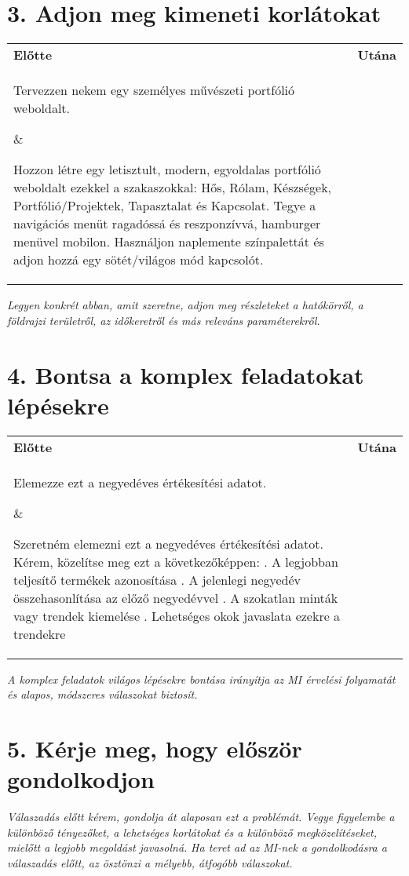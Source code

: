 \documentclass[a4paper, 11pt]{article}
\begin{document}
\section*{3. Adjon meg kimeneti korlátokat}
\begin{tabular}{p{} p{}}
\textbf{Előtte} & \textbf{Utána} \\
\parbox[t]{0.45\textwidth}{Tervezzen nekem egy személyes művészeti portfólió weboldalt.} & \parbox[t]{0.45\textwidth}{Hozzon létre egy letisztult, modern, egyoldalas portfólió weboldalt ezekkel a szakaszokkal: Hős, Rólam, Készségek, Portfólió/Projektek, Tapasztalat és Kapcsolat. Tegye a navigációs menüt ragadóssá és reszponzívvá, hamburger menüvel mobilon. Használjon naplemente színpalettát és adjon hozzá egy sötét/világos mód kapcsolót.} \\
\end{tabular}
\textit{Legyen konkrét abban, amit szeretne, adjon meg részleteket a hatókörről, a földrajzi területről, az időkeretről és más releváns paraméterekről.}

\section*{4. Bontsa a komplex feladatokat lépésekre}
\begin{tabular}{p{} p{}}
\textbf{Előtte} & \textbf{Utána} \\
\parbox[t]{0.45\textwidth}{Elemezze ezt a negyedéves értékesítési adatot.} & \parbox[t]{0.45\textwidth}{Szeretném elemezni ezt a negyedéves értékesítési adatot. Kérem, közelítse meg ezt a következőképpen: . A legjobban teljesítő termékek azonosítása . A jelenlegi negyedév összehasonlítása az előző negyedévvel . A szokatlan minták vagy trendek kiemelése . Lehetséges okok javaslata ezekre a trendekre} \\
\end{tabular}
\textit{A komplex feladatok világos lépésekre bontása irányítja az MI érvelési folyamatát és alapos, módszeres válaszokat biztosít.}

\section*{5. Kérje meg, hogy először gondolkodjon}
\textit{Válaszadás előtt kérem, gondolja át alaposan ezt a problémát. Vegye figyelembe a különböző tényezőket, a lehetséges korlátokat és a különböző megközelítéseket, mielőtt a legjobb megoldást javasolná.}
\textit{Ha teret ad az MI-nek a gondolkodásra a válaszadás előtt, az ösztönzi a mélyebb, átfogóbb válaszokat.}
\end{document}
